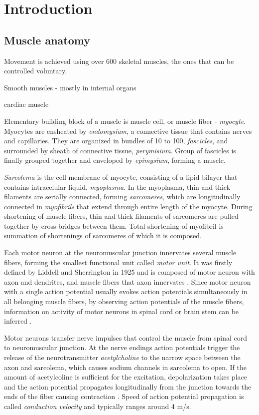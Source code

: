 
\chapter{Introduction}





\section{Muscle anatomy}

Movement is achieved using over 600 skeletal muscles, the ones that can be controlled voluntary. 

Smooth muscles - mostly in internal organs

cardiac muscle

Elementary building block of a muscle is muscle cell, or muscle fiber - \emph{myocyte}. Myocytes are ensheated by \emph{endomysium}, a connective tissue that contains nerves and capillaries. They are organized in bundles of 10 to 100, \emph{fascicles}, and surrounded by sheath of connective tissue, \emph{perymisium}. Group of fascicles is finally grouped together and enveloped by \emph{epimysium}, forming a muscle.

\emph{Sarcolema} is the cell membrane of myocyte, consisting of a lipid bilayer that contains intracelular liquid, \emph{myoplasma}. In the myoplasma, thin and thick filaments are serially connected, forming \emph{sarcomeres}, which are longitudinally connected in \emph{myofibrils} that extend through entire length of the myocyte. During shortening of muscle fibers, thin and thick filaments of sarcomeres are pulled together by cross-bridges between them. Total shortening of myofibril is summation of shortenings of sarcomeres of which it is composed.

Each motor neuron at the neuromuscular junction innervates several muscle fibers, forming the smallest functional unit called \emph{motor unit}. It was firstly defined by Liddell and Sherrington in 1925 \citep{Liddell1925, Sherrington1925} and is composed of motor neuron with axon and dendrites, and muscle fibers that axon innervates \citep{Duchateau2011}. Since motor neuron with a single action potential usually evokes action potentials simultaneously in all belonging muscle fibers, by observing action potentials of the muscle fibers, information on activity of motor neurons in spinal cord or brain stem can be inferred \citep{Merletti-Farina-book}. %

Motor neurons transfer nerve impulses that control the muscle from spinal cord to neuromuscular junction. At the nerve endings action potentials trigger the release of the neurotransmitter \emph{acetylcholine} to the narrow space between the axon and sarcolema, which causes sodium channels in sarcolema to open. If the amount of acetylcoline is sufficient for the excitation, depolarization takes place and the action potential propagates longitudinally from the junction towards the ends of the fiber causing contraction \citep{Henneberg1999}. Speed of action potential propagation is called \emph{conduction velocity} and typically ranges around 4 m/s. 

